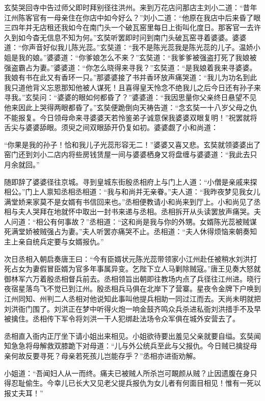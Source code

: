 \documentclass[12pt,UTF8]{ctexbook}
\begin{document}
玄奘哭回寺中告过师父即时拜别径往洪州。来到万花店问那店主刘小二道：“昔年江州陈客官有一母亲住在你店中如今好么？”刘小二道：“他原在我店中后来昏了眼三四年并无店租还我如今在南门头一个破瓦窑里每日上街叫化度日。那客官一去许久到如今杳无信息不知为何。”玄奘听罢即时问到南门头破瓦窑寻着婆婆。婆婆道：“你声音好似我儿陈光蕊。”玄奘道：“我不是陈光蕊我是陈光蕊的儿子。温娇小姐是我的娘。”婆婆道：“你爹娘怎么不来？”玄奘道：“我爹爹被强盗打死了我娘被强盗霸占为妻。”婆婆道：“你怎么晓得来寻我？”玄奘道：“是我娘着我来寻婆婆。我娘有书在此又有香环一只。”那婆婆接了书并香环放声痛哭道：“我儿为功名到此我只道他背义忘恩那知他被人谋死！且喜得皇天怜念不绝我儿之后今日还有孙子来寻我。”玄奘问：“婆婆的眼如何都昏了？”婆婆道：“我因思量你父亲终日悬望不见他来因此上哭得两眼都昏了。”玄奘便跪倒向天祷告道：“念玄奘一十八岁父母之仇不能报复。今日领母命来寻婆婆天若怜鉴弟子诚意保我婆婆双眼复明！”祝罢就将舌尖与婆婆舔眼。须臾之间双眼舔开仍复如初。婆婆觑了小和尚道：

“你果是我的孙子！恰和我儿子光蕊形容无二！”婆婆又喜又悲。玄奘就领婆婆出了窑门还到刘小二店内将些房钱赁屋一间与婆婆栖身又将盘缠与婆婆道：“我此去只月余就回。”

随即辞了婆婆径往京城。寻到皇城东街殷丞相府上与门上人道：“小僧是亲戚来探相公。”门上人禀知丞相丞相道：“我与和尚并无亲眷。”夫人道：“我昨夜梦见我女儿满堂娇来家莫不是女婿有书信回来也。”丞相便教请小和尚来到厅上。小和尚见了丞相与夫人哭拜在地就怀中取出一封书来递与丞相。丞相拆开从头读罢放声痛哭。夫人问道：“相公有何事故？”丞相道：“这和尚是我与你的外甥。女婿陈光蕊被贼谋死满堂娇被贼强占为妻。”夫人听罢亦痛哭不止。丞相道：“夫人休得烦恼来朝奏知主上亲自统兵定要与女婿报仇。”

次日丞相入朝启奏唐王曰：“今有臣婿状元陈光蕊带领家小江州赴任被稍水刘洪打死占女为妻假冒臣婿为官多年事属异变。乞陛下立人马剿除贼寇。”唐王见奏大怒就御林军六万着殷丞相督兵前去。丞相领旨出朝即往教场内点了兵径往江州进。晓行夜宿星落鸟飞不觉已到江州。殷丞相兵马俱在北岸下了营寨。星夜令金牌下户唤到江州同知、州判二人丞相对他说知此事叫他提兵相助一同过江而去。天尚未明就把刘洪衙门围了。刘洪正在梦中听得火炮一响金鼓齐鸣众兵杀进私衙刘洪措手不及早被擒住。丞相传下军令将刘洪一干人犯绑赴法场令众军俱在城外安营去了。

丞相直入衙内正厅坐下请小姐出来相见。小姐欲待要出羞见父亲就要自缢。玄奘闻知急急将母解救双膝跪下对母道：“儿与外公统兵至此与父报仇。今日贼已擒捉母亲何故反要寻死？母亲若死孩儿岂能存乎？”丞相亦进衙劝解。

小姐道：“吾闻妇人从一而终。痛夫已被贼人所杀岂可靦颜从贼？止因遗腹在身只得忍耻偷生。今幸儿已长大又见老父提兵报仇为女儿者有何面目相见！惟有一死以报丈夫耳！”
\end{document}
